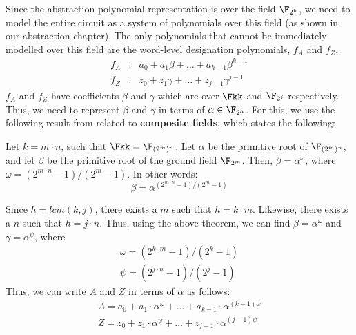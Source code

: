 Since the abstraction polynomial representation is over the field 
$\F_{2^h}$, we need to model the entire circuit as a system of polynomials 
over this field (as shown in our abstraction chapter).
The only polynomials that cannot be 
immediately modelled over this field are the word-level designation 
polynomials, $f_A$ and $f_Z$.
\begin{eqnarray}
f_A&:&a_0 + a_1\beta + \dots + a_{k-1}\beta^{k-1} \nonumber \\
f_Z&:&z_0 + z_1\gamma + \dots + z_{j-1}\gamma^{j-1} \nonumber
\end{eqnarray}
$f_A$ and $f_Z$ have coefficients $\beta$ and $\gamma$
which are over $\Fkk$ and $\F_{2^j}$ respectively.
Thus, we need to represent $\beta$ and $\gamma$ in terms of 
$\alpha \in \F_{2^h}$.
For this, we
use the following result from \cite{cf:2003} related to 
{\bf composite fields}, which states the following:

\begin{Theorem}
Let $k = m\cdot n$, such that $\Fkk = \F_{(2^m)^n}$. Let $\alpha$ be
the primitive root of $\F_{(2^m)^n}$, and let $\beta$ be the
primitive root of the ground field $\F_{2^m}$. Then,
$\beta=\alpha^{\omega}$, where $\omega=(2 ^{m \cdot n}-1)/(2^m-1)$. 
In other words: 
\begin{equation}
\beta=\alpha^{(2^{m \cdot n}-1)/(2^m-1)} \nonumber
\label{eqn:relation}
\end{equation}
\label{thm:2to3thm}
\end{Theorem}
Since $h=lcm(k,j)$, there exists a $m$ such that $h = k\cdot m$.
Likewise, there exists a $n$ such that $h = j\cdot n$.
Thus, using the above theorem, we can find $\beta = \alpha^\omega$ and 
$\gamma = \alpha^\psi$, where
\begin{eqnarray}
\omega = (2^{k \cdot m}-1)/(2^k-1) \nonumber \\
\psi = (2^{j \cdot n}-1)/(2^j-1) \nonumber 
\end{eqnarray}
Thus, we can write $A$ and $Z$ in terms of $\alpha$ as follows:
\begin{eqnarray}
A = a_0+a_1\cdot\alpha^\omega+\dots+a_{k-1}\cdot\alpha^{(k-1)\omega} \nonumber \\
Z = z_0+z_1\cdot\alpha^\psi+\dots+z_{j-1}\cdot\alpha^{(j-1)\psi} \nonumber
\end{eqnarray}

